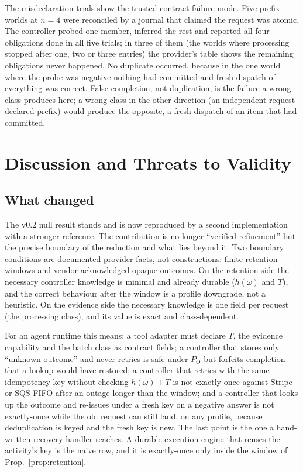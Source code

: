 \documentclass[conference,10pt]{IEEEtran}
\newcommand{\PO}{P_{\mathrm{O}}}
\begin{document}
The misdeclaration trials show the trusted-contract failure mode. Five prefix worlds at $n=4$ were reconciled by a journal that claimed the request was atomic. The controller probed one member, inferred the rest and reported all four obligations done in all five trials; in three of them (the worlds where processing stopped after one, two or three entries) the provider's table shows the remaining obligations never happened. No duplicate occurred, because in the one world where the probe was negative nothing had committed and fresh dispatch of everything was correct. False completion, not duplication, is the failure a wrong class produces here; a wrong class in the other direction (an independent request declared prefix) would produce the opposite, a fresh dispatch of an item that had committed.

\section{Discussion and Threats to Validity}

\subsection{What changed}
The v0.2 null result stands and is now reproduced by a second implementation with a stronger reference. The contribution is no longer ``verified refinement'' but the precise boundary of the reduction and what lies beyond it. Two boundary conditions are documented provider facts, not constructions: finite retention windows and vendor-acknowledged opaque outcomes. On the retention side the necessary controller knowledge is minimal and already durable ($h(\omega)$ and $T$), and the correct behaviour after the window is a profile downgrade, not a heuristic. On the evidence side the necessary knowledge is one field per request (the processing class), and its value is exact and class-dependent.

For an agent runtime this means: a tool adapter must declare $T$, the evidence capability and the batch class as contract fields; a controller that stores only ``unknown outcome'' and never retries is safe under $\PO$ but forfeits completion that a lookup would have restored; a controller that retries with the same idempotency key without checking $h(\omega)+T$ is not exactly-once against Stripe or SQS FIFO after an outage longer than the window; and a controller that looks up the outcome and re-issues under a fresh key on a negative answer is not exactly-once while the old request can still land, on any profile, because deduplication is keyed and the fresh key is new. The last point is the one a hand-written recovery handler reaches. A durable-execution engine that reuses the activity's key is the naive row, and it is exactly-once only inside the window of Prop.~\ref{prop:retention}.
\end{document}
